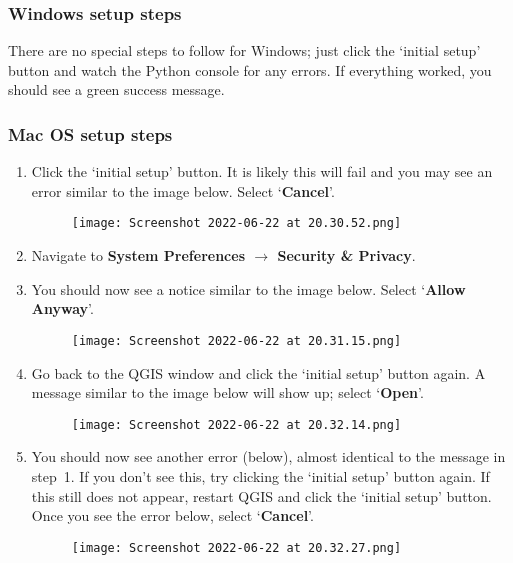 \subsubsection{Windows setup steps}
There are no special steps to follow for Windows; just click the `initial setup' button and watch the Python console for any errors. If everything worked, you should see a green success message.

\subsubsection{Mac OS setup steps}
\begin{enumerate}
    \item Click the `initial setup' button. It is likely this will fail and you may see an error similar to the image below. Select `\textbf{Cancel}'.
    \begin{figure}[h!]
        \centering
        \texttt{[image: Screenshot 2022-06-22 at 20.30.52.png]}
        \label{fig:mac1}
    \end{figure}
    
    \item Navigate to \textbf{System Preferences $\rightarrow$ Security \& Privacy}.
    \clearpage
    
    \item You should now see a notice similar to the image below. Select `\textbf{Allow Anyway}'.
    \begin{figure}[h!]
        \centering
        \texttt{[image: Screenshot 2022-06-22 at 20.31.15.png]}
        \label{fig:mac2}
    \end{figure}
    
    \item Go back to the QGIS window and click the `initial setup' button again. A message similar to the image below will show up; select `\textbf{Open}'.
    \begin{figure}[h!]
        \centering
        \texttt{[image: Screenshot 2022-06-22 at 20.32.14.png]}
        \label{fig:mac3}
    \end{figure}
    \clearpage
    
    \item You should now see another error (below), almost identical to the message in step~1. If you don't see this, try clicking the `initial setup' button again. If this still does not appear, restart QGIS and click the `initial setup' button. Once you see the error below, select `\textbf{Cancel}'.
    \begin{figure}[h!]
        \centering
        \texttt{[image: Screenshot 2022-06-22 at 20.32.27.png]}
        \label{fig:mac4}
    \end{figure}
    

\end{enumerate}
